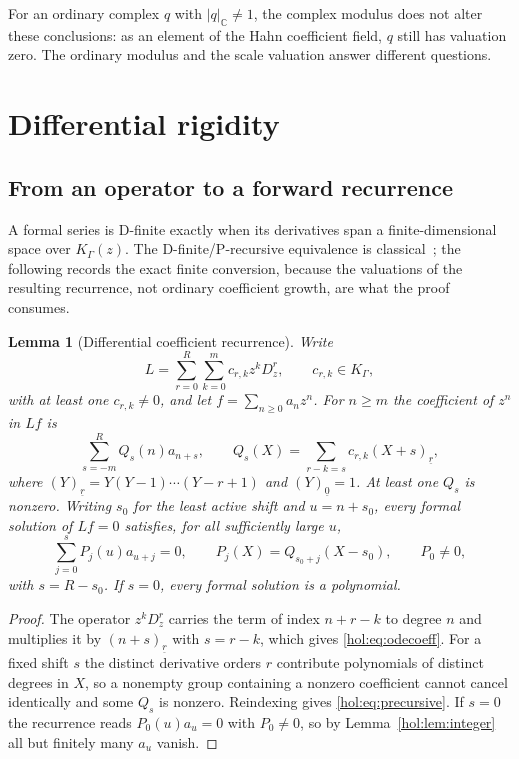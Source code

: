 \documentclass[11pt]{article}
\numberwithin{equation}{section}
\newtheorem{lemma}[theorem]{Lemma}
\theoremstyle{definition}
\theoremstyle{remark}
\newcommand{\C}{\mathbb C}
\newcommand{\K}{K_\Gamma}
\newcommand{\fall}[2]{(#1)_{\underline{#2}}}
\newcommand{\abs}[1]{\lvert#1\rvert}
\begin{document}
For an ordinary complex $q$ with $\abs q_\C\ne1$, the complex modulus does not
alter these conclusions: as an element of the Hahn coefficient field, $q$
still has valuation zero. The ordinary modulus and the scale valuation answer
different questions.

\section{Differential rigidity}\label{hol:sec:ode}

\subsection{From an operator to a forward recurrence}

A formal series is D-finite exactly when its derivatives span a
finite-dimensional space over $\K(z)$. The D-finite/P-recursive equivalence is
classical~\cite[Theorem~1.5]{stanley}; the following records the exact finite
conversion, because the valuations of the resulting recurrence, not ordinary
coefficient growth, are what the proof consumes.

\begin{lemma}[Differential coefficient recurrence]\label{hol:lem:drec}
Write
\begin{equation}\label{hol:eq:operator}
 L=\sum_{r=0}^R\sum_{k=0}^mc_{r,k}z^kD_z^r,\qquad c_{r,k}\in\K,
\end{equation}
with at least one $c_{r,k}\ne0$, and let $f=\sum_{n\ge0}a_nz^n$. For $n\ge m$
the coefficient of $z^n$ in $Lf$ is
\begin{equation}\label{hol:eq:odecoeff}
 \sum_{s=-m}^{R}Q_s(n)a_{n+s},\qquad
 Q_s(X)=\sum_{r-k=s}c_{r,k}\fall{X+s}{r},
\end{equation}
where $\fall Yr=Y(Y-1)\cdots(Y-r+1)$ and $\fall Y0=1$. At least one $Q_s$ is
nonzero. Writing $s_0$ for the least active shift and $u=n+s_0$, every formal
solution of $Lf=0$ satisfies, for all sufficiently large $u$,
\begin{equation}\label{hol:eq:precursive}
 \sum_{j=0}^{s}P_j(u)a_{u+j}=0,\qquad P_j(X)=Q_{s_0+j}(X-s_0),
 \qquad P_0\ne0,
\end{equation}
with $s=R-s_0$. If $s=0$, every formal solution is a polynomial.
\end{lemma}

\begin{proof}
The operator $z^kD_z^r$ carries the term of index $n+r-k$ to degree $n$ and
multiplies it by $\fall{n+s}{r}$ with $s=r-k$, which gives
\eqref{hol:eq:odecoeff}. For a fixed shift $s$ the distinct derivative orders
$r$ contribute polynomials of distinct degrees in $X$, so a nonempty group
containing a nonzero coefficient cannot cancel identically and some $Q_s$ is
nonzero. Reindexing gives \eqref{hol:eq:precursive}. If $s=0$ the recurrence
reads $P_0(u)a_u=0$ with $P_0\ne0$, so by Lemma~\ref{hol:lem:integer} all but
finitely many $a_u$ vanish.
\end{proof}
\end{document}
